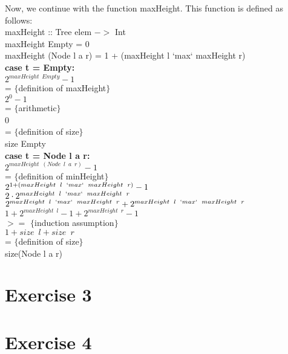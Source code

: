 \documentclass{article}
\begin{document}
\begin{enumerate}
  Now, we continue with the function maxHeight. This function is defined as follows:\\
  maxHeight :: Tree elem $->$ Int \\
  maxHeight Empty = 0 \\
  maxHeight (Node l a r) = 1 + (maxHeight l `max` maxHeight r) \\
  \newline
  \textbf{case t = Empty:} \\
  $2^{maxHeight \enspace Empty} - 1$ \\
  = $\{$definition of maxHeight$\}$ \\
  $2^0 - 1$ \\
  = $\{$arithmetic$\}$ \\
  0 \\
  = $\{$definition of size$\}$ \\
  size Empty \\
  \newline
  \textbf{case t = Node l a r:} \\
  $2^{maxHeight \enspace (Node \enspace l \enspace a \enspace r)} - 1$ \\
  = $\{$definition of minHeight$\}$ \\
  $2^{1 + (maxHeight \enspace l \enspace `max` \enspace maxHeight \enspace r)} - 1$ \\
  $2 \cdot 2^{maxHeight \enspace l \enspace `max` \enspace maxHeight \enspace r}$ \\
  $2^{maxHeight \enspace l \enspace `max` \enspace maxHeight \enspace r} + 2^{maxHeight \enspace l \enspace `max` \enspace maxHeight \enspace r}$ \\
  $1 + 2^{maxHeight \enspace l} - 1 + 2^{maxHeight \enspace r} - 1$ \\
  $>=$ $\{$induction assumption$\}$ \\
  $1 + size \enspace l + size \enspace r$ \\
  = $\{$definition of size$\}$ \\
  size(Node l a r)
\end{enumerate}

\section*{Exercise 3}
\section*{Exercise 4}
%
%
%
%
\end{document}
